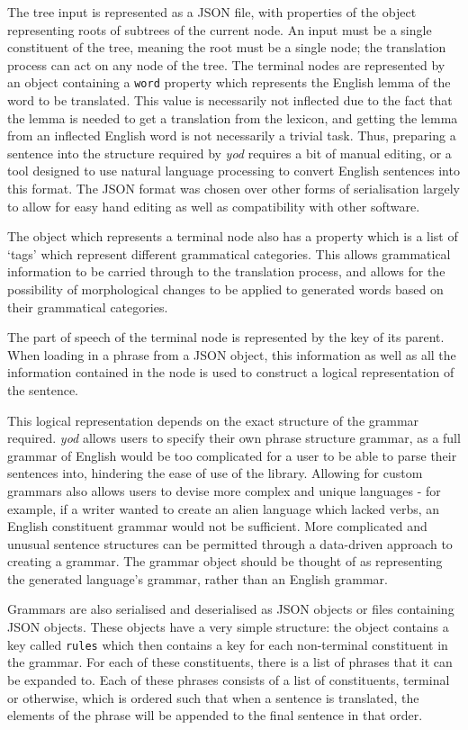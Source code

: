 \documentclass{report}
\begin{document}
	The tree input is represented as a JSON file, with properties of the object representing roots of subtrees of the current node. An input must be a single constituent of the tree, meaning the root must be a single node; the translation process can act on any node of the tree. The terminal nodes are represented by an object containing a \texttt{word} property which represents the English lemma of the word to be translated. This value is necessarily not inflected due to the fact that the lemma is needed to get a translation from the lexicon, and getting the lemma from an inflected English word is not necessarily a trivial task. Thus, preparing a sentence into the structure required by \textit{yod} requires a bit of manual editing, or a tool designed to use natural language processing to convert English sentences into this format. The JSON format was chosen over other forms of serialisation largely to allow for easy hand editing as well as compatibility with other software.
	
	The object which represents a terminal node also has a property which is a list of `tags' which represent different grammatical categories. This allows grammatical information to be carried through to the translation process, and allows for the possibility of morphological changes to be applied to generated words based on their grammatical categories. 
	
	The part of speech of the terminal node is represented by the key of its parent. When loading in a phrase from a JSON object, this information as well as all the information contained in the node is used to construct a logical representation of the sentence.
	
	This logical representation depends on the exact structure of the grammar required. \textit{yod} allows users to specify their own phrase structure grammar, as a full grammar of English would be too complicated for a user to be able to parse their sentences into, hindering the ease of use of the library. Allowing for custom grammars also allows users to devise more complex and unique languages - for example, if a writer wanted to create an alien language which lacked verbs, an English constituent grammar would not be sufficient. More complicated and unusual sentence structures can be permitted through a data-driven approach to creating a grammar. The grammar object should be thought of as representing the generated language's grammar, rather than an English grammar.
	
	Grammars are also serialised and deserialised as JSON objects or files containing JSON objects. These objects have a very simple structure: the object contains a key called \texttt{rules} which then contains a key for each non-terminal constituent in the grammar. For each of these constituents, there is a list of phrases that it can be expanded to. Each of these phrases consists of a list of constituents, terminal or otherwise, which is ordered such that when a sentence is translated, the elements of the phrase will be appended to the final sentence in that order.
	
\end{document}
